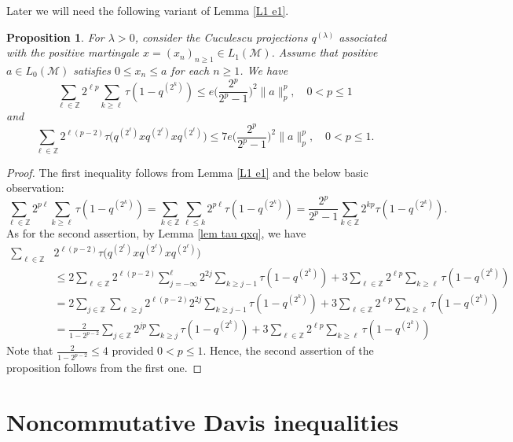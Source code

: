\documentclass[11]{amsart}
\numberwithin{equation}{section}
\newtheorem{proposition}[theorem]{Proposition}
\begin{document}
Later we will need  the following variant of Lemma \ref{L1 e1}.
\begin{proposition}\label{prop 3}
	For $\lambda>0$, consider the Cuculescu projections $q^{(\lambda)}$ associated with the positive martingale 	 $x=(x_n)_{n\geq1}\in L_1(\mathcal{M})$.  Assume that	positive $a\in L_0(\mathcal{M})$ satisfies $0\leq x_n\leq a$ for each $n\geq1$. We have 
	$$\sum_{\ell\in\mathbb{Z}} 2^{\ell p} \sum_{k\geq \ell}\tau(1-q^{(2^k)})\leq e\Big(\frac{2^{p}}{2^p-1}\Big)^2\|a\|_p^p,\quad 0<p\leq 1$$
	and 
	$$\sum_{\ell\in\mathbb{Z}} 2^{\ell(p-2)}	\tau\Big(q^{(2^{\ell})}xq^{(2^{\ell})}xq^{(2^{\ell})}\Big)\leq 7e\Big(\frac{2^{p}}{2^p-1}\Big)^2\|a\|_p^p,\quad 0<p\leq 1.$$
\end{proposition}
\begin{proof}
	The first inequality follows from Lemma \ref{L1 e1} and the below basic observation:	
	$$\sum_{\ell\in\mathbb{Z}} 2^{p\ell} \sum_{k\geq \ell}\tau(1-q^{(2^k)})=\sum_{k\in\mathbb{Z}}\sum_{\ell\leq k} 2^{p\ell} \tau(1-q^{(2^k)})=\frac{2^p}{2^p-1}\sum_{k\in \mathbb{Z}} 2^{kp}\tau(1-q^{(2^k)}).$$
	As for the second assertion, by Lemma \ref{lem tau qxq}, we have 
	\begin{align*}
		\sum_{\ell\in\mathbb{Z}}& 2^{\ell(p-2)}	\tau\Big(q^{(2^{\ell})}xq^{(2^{\ell})}xq^{(2^{\ell})}\Big)\\
		&\leq 2\sum_{\ell\in\mathbb{Z}} 2^{\ell(p-2)} \sum_{j=-\infty}^{\ell}2^{2j}\sum_{k\geq j-1}\tau(1-q^{(2^k)})+3\sum_{\ell\in\mathbb{Z}} 2^{\ell p} \sum_{k\geq \ell}\tau(1-q^{(2^k)})\\
		&= 2\sum_{j\in\mathbb{Z}}\sum_{\ell\geq j} 2^{\ell(p-2)} 2^{2j}\sum_{k\geq j-1}\tau(1-q^{(2^k)})+3\sum_{\ell\in\mathbb{Z}} 2^{\ell p} \sum_{k\geq \ell}\tau(1-q^{(2^k)})\\
		&=\frac{2}{1-2^{p-2}}\sum_{j\in\mathbb{Z}}2^{jp}\sum_{k\geq j}\tau(1-q^{(2^k)})+3\sum_{\ell\in\mathbb{Z}} 2^{\ell p} \sum_{k\geq \ell}\tau(1-q^{(2^k)})\
	\end{align*}
	Note that  $\frac{2}{1-2^{p-2}}\leq 4$ provided $0<p\leq 1$. Hence,  the second assertion of the proposition follows from the first one. 
\end{proof}








\section{Noncommutative Davis inequalities}\label{sec-davis}
\end{document}

